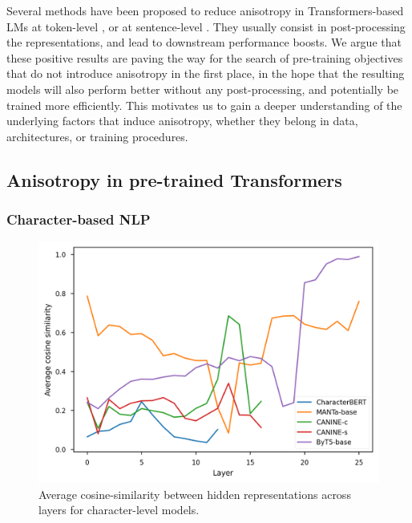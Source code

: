 Several methods have been proposed to reduce anisotropy in Transformers-based LMs at token-level \citep{rajaee-pilehvar-2021-cluster, Wang2020Improving}, or at sentence-level \citep{gao-etal-2021-simcse, yan-etal-2021-consert, su2021whitening}. They usually consist in post-processing the representations, and lead to downstream performance boosts. We argue that these positive results are paving the way for the search of pre-training objectives that do not introduce anisotropy in the first place, in the hope that the resulting models will also perform better without any post-processing, and potentially be trained more efficiently. This motivates us to gain a deeper understanding of the underlying factors that induce anisotropy, whether they belong in data, architectures, or training procedures.

\subsection{Anisotropy in pre-trained Transformers}
\subsubsection{Character-based NLP}
\label{sec:charbased}
\begin{figure}[ht]
    \centering
     \includegraphics[width=0.9\columnwidth]{sources/part_1/anisotropy/imgs/cosine_char_based.png}
     \caption{Average cosine-similarity between hidden representations across layers for character-level models.}
     \label{fig:cos_char_aware}
\end{figure}


